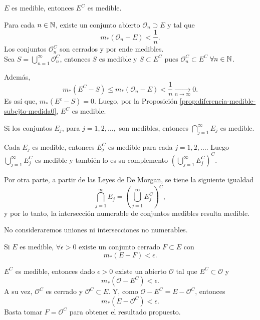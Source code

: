\begin{proposicion}{}
$E$ es medible, entonces $E^C$ es medible.
\end{proposicion}

\begin{demo}{}
Para cada $n \in \mathbb{N}$, existe un conjunto abierto $\mathcal{O}_n \supset E$ y tal que 
\[
m_{*}(\mathcal{O}_n-E)<\frac{1}{n}.
\]
Los conjuntos $\mathcal{O}_n^C$ son cerrados y por ende medibles. \\
Sea $S=\bigcup\limits_{n=1}^{\infty} \mathcal{O}_n^C$, entonces $S$ es medible y $S\subset E^C$ pues $\mathcal{O}_n^C \subset E^C$ $\forall n\in \mathbb{N}$.

Adem\'as, 
\[
m_{*}(E^C-S)\leq m_{*}(\mathcal{O}_n-E)<\frac{1}{n} \xrightarrow[ n \to \infty]{} 0.
\]
Es as\'i que,   $m_{*}(E^c-S)=0$. Luego,  por la Proposici\'on \ref{prop:diferencia-medible-subcjto-medida0}, $E^C$ es medible.
\end{demo}

\begin{proposicion}{}
Si los conjuntos $E_j$, para $j=1,2,\ldots,$ son medibles, entonces
$\bigcap\limits_{j=1}^{\infty}E_j$ es medible.
\end{proposicion}

\begin{demo}
Cada $E_j$ es medible, entonces $E_j^C$ es medible para cada $j=1,2,\ldots$. Luego $\bigcup\limits_{j=1}^{\infty} E_j^C$ es medible y tambi\'en lo es su complemento 
$ \left(\bigcup\limits_{j=1}^{\infty} E_j^C\right)^C$.

Por otra parte,  a partir de las Leyes de De Morgan, se tiene la siguiente igualdad
\[
\bigcap\limits_{j=1}^{\infty}E_j= 
\left( \bigcup\limits_{j=1}^{\infty} E_j^C\right)^C,
\]
y por lo tanto, la intersecci\'on numerable de conjuntos medibles  resulta medible.
\end{demo}


No consideraremos uniones ni intersecciones no numerables.

\begin{proposicion}{}
Si $E$ es medible, $\forall \epsilon>0$ existe un conjunto cerrado $F\subset E$ con
\[
m_{*}(E-F)<\epsilon.
\]
\end{proposicion}

\begin{demo}
$E^C$ es medible, entonces dado $\epsilon>0$ existe un abierto $\mathcal{O}$ tal que $E^C \subset \mathcal{O}$ y 
\[
m_{*}(\mathcal{O}-E^C)<\epsilon.
\]
A su vez, $\mathcal{O}^C$ es cerrado y $\mathcal{O}^C\subset E$. 
Y, como $\mathcal{O}-E^C=E-\mathcal{O}^C$, entonces
\[
m_{*}(E-\mathcal{O}^C)<\epsilon.
\]
Basta tomar $F=\mathcal{O}^C$ para obtener el resultado propuesto.
\end{demo}